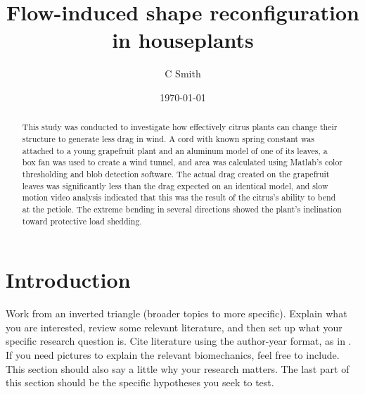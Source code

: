\documentclass{article}
\title{Flow-induced shape reconfiguration in houseplants}
\author{C Smith}
\date{\today}
\begin{document}
\maketitle
\begin{abstract}
This study was conducted to investigate how effectively citrus plants can change their structure to generate less drag in wind. A cord with known spring constant was attached to a young grapefruit plant and an aluminum model of one of its leaves, a box fan was used to create a wind tunnel, and area was calculated using Matlab's color thresholding and blob detection software. The actual drag created on the grapefruit leaves was significantly less than the drag expected on an identical model, and slow motion video analysis indicated that this was the result of the citrus's ability to bend at the petiole. The extreme bending in several directions showed the plant's inclination toward protective load shedding.

\end{abstract}

\section{Introduction}

Work from an inverted triangle (broader topics to more specific). Explain what you are interested, review some relevant literature, and then set up what your specific research question is. Cite literature using the author-year format, as in \citep{buck2020go}. If you need pictures to explain the relevant biomechanics, feel free to include. This section should also say a little why your research matters. 
The last part of this section should be the specific hypotheses you seek to test. 
\end{document}
